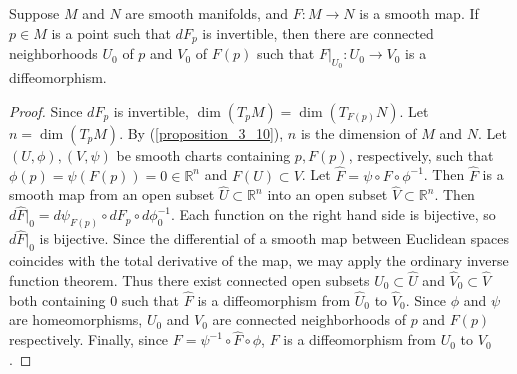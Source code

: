 \begin{customthm}{4.5}
  Suppose $M$ and $N$ are smooth manifolds, and $F: M \rightarrow N$ is a smooth map.
  If $p \in M$ is a point such that $dF_p$ is invertible, then there are connected neighborhoods $U_0$ of $p$ and $V_0$ of $F(p)$ such that $F\vert_{U_0}: U_0 \rightarrow V_0$ is a diffeomorphism.
\end{customthm}

\begin{proof}
  Since $dF_p$ is invertible, $\dim(T_pM) = \dim(T_{F(p)}N)$.
  Let $n = \dim(T_pM)$.
  By (\ref{proposition_3_10}), $n$ is the dimension of $M$ and $N$.
  Let $(U, \phi), (V, \psi)$ be smooth charts containing $p, F(p)$, respectively, such that $\phi(p) = \psi(F(p)) = 0 \in \mathbb{R}^n$ and $F(U) \subset V$.
  Let $\hat{F} = \psi \circ F \circ \phi^{-1}$.
  Then $\hat{F}$ is a smooth map from an open subset $\hat{U} \subset \mathbb{R}^n$ into an open subset $\hat{V} \subset \mathbb{R}^n$.
  Then $d\hat{F}\vert_0 = d\psi_{F(p)} \circ dF_p \circ d\phi^{-1}_0$.
  Each function on the right hand side is bijective, so $d\hat{F}\vert_0$ is bijective.
  Since the differential of a smooth map between Euclidean spaces coincides with the total derivative of the map, we may apply the ordinary inverse function theorem.
  Thus there exist connected open subsets $\hat{U}_0 \subset \hat{U}$ and $\hat{V}_0 \subset \hat{V}$ both containing 0 such that $\hat{F}$ is a diffeomorphism from $\hat{U}_0$ to $\hat{V}_0$.
  Since $\phi$ and $\psi$ are homeomorphisms, $U_0$ and $V_0$ are connected neighborhoods of $p$ and $F(p)$ respectively.
  Finally, since $F = \psi^{-1} \circ \hat{F} \circ \phi$, $F$ is a diffeomorphism from $U_0$ to $V_0$.
\end{proof}
